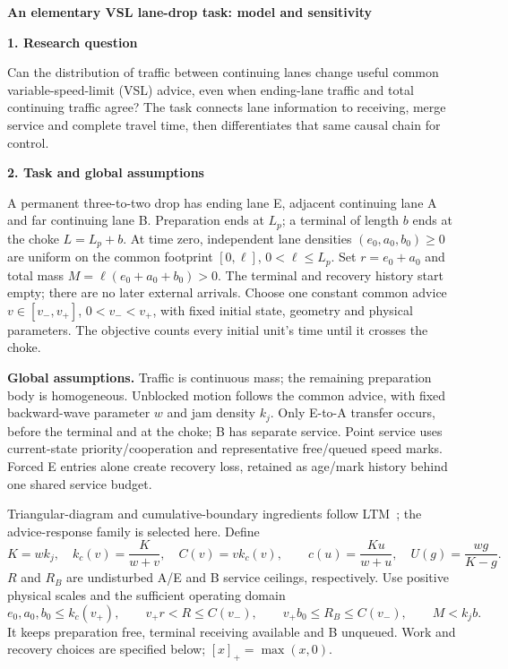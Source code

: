 \documentclass[10pt,a4paper]{article}
\newcommand{\head}[1]{\par\vspace{4pt}\noindent\textbf{#1}\par\nobreak\vspace{1pt}}
\begin{document}
\begin{center}
{\large\bfseries An elementary VSL lane-drop task: model and sensitivity}
\end{center}
\vspace{-5pt}

\head{1. Research question}
Can the distribution of traffic between continuing lanes change useful
common variable-speed-limit (VSL) advice, even when ending-lane traffic and
total continuing traffic agree? The task connects lane information to
receiving, merge service and complete travel time, then differentiates that
same causal chain for control.

\head{2. Task and global assumptions}
A permanent three-to-two drop has ending lane E, adjacent continuing lane A
and far continuing lane B. Preparation ends at $L_p$; a terminal of length
$b$ ends at the choke $L=L_p+b$. At time zero, independent lane densities
$(e_0,a_0,b_0)\geq0$ are uniform on the common footprint $[0,\ell]$,
$0<\ell\leq L_p$. Set $r=e_0+a_0$ and total mass
$M=\ell(e_0+a_0+b_0)>0$. The terminal and recovery history start empty;
there are no later external arrivals. Choose one constant common advice
$v\in[v_-,v_+]$, $0<v_-<v_+$, with fixed initial state, geometry and physical parameters.
The objective counts every initial unit's time until it crosses the choke.

\textbf{Global assumptions.}
Traffic is continuous mass; the remaining preparation body is homogeneous.
Unblocked motion follows the common advice, with fixed backward-wave
parameter $w$ and jam density $k_j$. Only E-to-A transfer occurs, before
the terminal and at the choke; B has separate service. Point service uses
current-state priority/cooperation and representative free/queued speed
marks. Forced E entries alone create recovery loss, retained as age/mark
history behind one shared service budget.

Triangular-diagram and cumulative-boundary ingredients follow
LTM~\cite{jin}; the advice-response family is selected here. Define
\begin{equation}
 K=wk_j,\quad k_c(v)=\frac{K}{w+v},\quad C(v)=vk_c(v),\qquad
 c(u)=\frac{Ku}{w+u},\quad U(g)=\frac{wg}{K-g}.
 \label{eq:fd}
\end{equation}
$R$ and $R_B$ are undisturbed A/E and B service ceilings, respectively.
Use positive physical scales and the sufficient operating domain
\begin{equation}
 e_0,a_0,b_0\leq k_c(v_+),\qquad
 v_+r<R\leq C(v_-),\qquad v_+b_0\leq R_B\leq C(v_-),\qquad M<k_jb.
 \label{eq:domain}
\end{equation}
It keeps preparation free, terminal receiving available and B unqueued.
Work and recovery choices are specified below; $[x]_+=\max(x,0)$.
\end{document}
